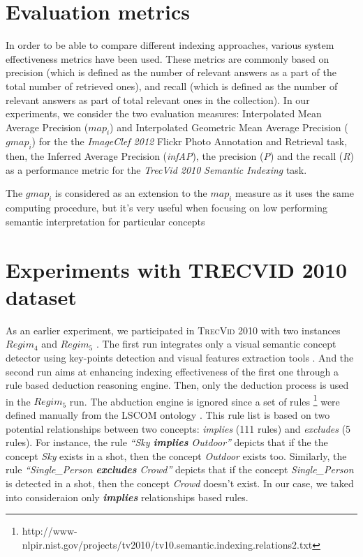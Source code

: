 		\section{Evaluation metrics}
		In order to be able to compare different indexing approaches, various system 
		effectiveness metrics have been used. These metrics are commonly based on precision
		(which is defined as the number of relevant answers as a part of the total number
		of retrieved ones), and recall (which is defined as the number of relevant answers
		as part of total relevant ones in the collection). In our experiments, we consider the two
 		evaluation measures: Interpolated Mean Average Precision (\textit{$map_{i}$}) and Interpolated 
		Geometric Mean Average Precision (\textit{$gmap_{i}$}) \cite{Thomee2012}
		for the the \textit{ImageClef 2012} Flickr
 		Photo Annotation and Retrieval task, then, the Inferred Average Precision (\textit{infAP}), the precision 			(\textit{P}) and the recall (\textit{R}) as a
		performance metric for the \textit{TrecVid 2010} \textit{Semantic Indexing} task.

		The \textit{$gmap_{i}$} is considered as an extension to the \textit{$map_{i}$} measure as it uses the same 
		computing procedure, but it's very useful when focusing on low performing semantic 
		interpretation for particular concepts

		\section{Experiments with TRECVID 2010 dataset}
		As an earlier experiment, we participated in \textsc{TrecVid 2010} 
		with two instances \textbf{\textit{$Regim_{4}$}} and  \textbf{\textit{$Regim_{5}$}} \cite{Elleuch2010a}. 
		The first run integrates only a visual semantic concept detector using key-points detection 
		and visual features extraction tools \cite{Elleuch2011a}. And the second run aims at enhancing indexing 
		effectiveness of the first one through a rule based deduction reasoning engine.  
		Then, only the deduction process is used in the  \textbf{\textit{$Regim_{5}$}} run. 
		The abduction engine is ignored since a set of rules 
		\footnote{http://www-nlpir.nist.gov/projects/tv2010/tv10.semantic.indexing.relations2.txt} 
		were defined manually from the LSCOM ontology \cite{Kennedy2006}. 
		This rule list is based on two potential relationships between two concepts: 
		\emph{implies} (111 rules) and \emph{excludes} (5 rules). 
		For instance, the rule \textit{``Sky \textbf{implies} Outdoor''} depicts that if the the concept 
		\textit{Sky} exists in a shot, then the concept \textit{Outdoor} exists too. 
		Similarly, the rule \textit{``Single\_Person \textbf{excludes} Crowd''} depicts that if the concept 
		\textit{Single\_Person} is detected in a shot, then the concept \textit{Crowd} doesn't exist.
		In our case, we taked into consideraion only \textit{\textbf{implies}} relationships based rules.


